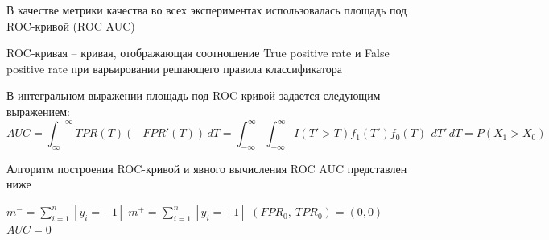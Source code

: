 \indent В качестве метрики качества во всех экспериментах использовалась площадь под ROC-кривой (ROC AUC)
\begin{definition}
\indent ROC-кривая – кривая, отображающая соотношение True positive rate и False positive rate при варьировании решающего правила классификатора
\end{definition}
\indent В интегральном выражении площадь под ROC-кривой задается следующим выражением:
\begin{equation}
\label{roc-auc}
    AUC =\int _{\infty }^{-\infty }{TPR}(T)\left(-FPR'(T)\right)\,dT=\int _{-\infty }^{\infty }\int _{-\infty }^{\infty }I(T'>T)f_{1}(T')f_{0}(T)\, \ dT'\,dT=P(X_{1}>X_{0})
\end{equation}

\indent Алгоритм построения ROC-кривой и явного вычисления ROC AUC представлен ниже\\
\begin{algorithm}[H]
    $m^- = \sum_{i=1}^n [y_i=-1]\;
    m^+ = \sum_{i=1}^n [y_i = +1]$\;
    $(FPR_0, \ TPR_0) = (0,0)$\;
    $AUC = 0$\;
\end{algorithm}
